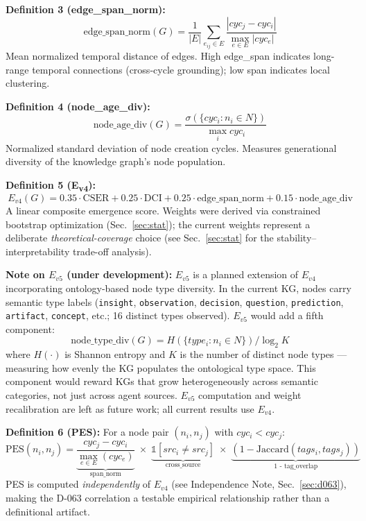 \documentclass[12pt]{article}
\begin{document}
\textbf{Definition 3 (edge\_span\_norm):}
\[
  \text{edge\_span\_norm}(G) = \frac{1}{|E|} \sum_{e_{ij} \in E} \frac{|cyc_j - cyc_i|}{\max_{e \in E}|cyc_e|}
\]
Mean normalized temporal distance of edges. High edge\_span indicates long-range
temporal connections (cross-cycle grounding); low span indicates local clustering.

\textbf{Definition 4 (node\_age\_div):}
\[
  \text{node\_age\_div}(G) = \frac{\sigma(\{cyc_i : n_i \in N\})}{\max_i cyc_i}
\]
Normalized standard deviation of node creation cycles. Measures generational diversity
of the knowledge graph's node population.

\textbf{Definition 5 (E\textsubscript{v4}):}
\[
  E_{v4}(G) = 0.35 \cdot \text{CSER} + 0.25 \cdot \text{DCI}
            + 0.25 \cdot \text{edge\_span\_norm} + 0.15 \cdot \text{node\_age\_div}
\]
A linear composite emergence score. Weights were derived via constrained bootstrap
optimization (Sec.~\ref{sec:stat}); the current weights represent a deliberate
\emph{theoretical-coverage} choice (see Sec.~\ref{sec:stat} for the
stability--interpretability trade-off analysis).

\medskip\noindent\textbf{Note on $E_{v5}$ (under development):}
$E_{v5}$ is a planned extension of $E_{v4}$ incorporating ontology-based node type
diversity. In the current KG, nodes carry semantic type labels
(\texttt{insight}, \texttt{observation}, \texttt{decision}, \texttt{question},
\texttt{prediction}, \texttt{artifact}, \texttt{concept}, etc.; 16 distinct types observed).
$E_{v5}$ would add a fifth component:
\[
  \text{node\_type\_div}(G) = H(\{type_i : n_i \in N\}) / \log_2 K
\]
where $H(\cdot)$ is Shannon entropy and $K$ is the number of distinct node types ---
measuring how evenly the KG populates the ontological type space. This component
would reward KGs that grow heterogeneously across semantic categories, not just
across agent sources. $E_{v5}$ computation and weight recalibration are left as
future work; all current results use $E_{v4}$.

\textbf{Definition 6 (PES):}
For a node pair $(n_i, n_j)$ with $cyc_i < cyc_j$:
\[
  \text{PES}(n_i, n_j)
  = \underbrace{\frac{cyc_j - cyc_i}{\max_{e \in E}(cyc_e)}}_{\text{span\_norm}}
    \;\times\; \underbrace{\mathbb{1}[src_i \neq src_j]}_{\text{cross\_source}}
    \;\times\; \underbrace{(1 - \text{Jaccard}(tags_i, tags_j))}_{\text{1 - tag\_overlap}}
\]
PES is computed \emph{independently} of $E_{v4}$ (see Independence Note, Sec.~\ref{sec:d063}),
making the D-063 correlation a testable empirical relationship rather than a definitional artifact.
\end{document}
